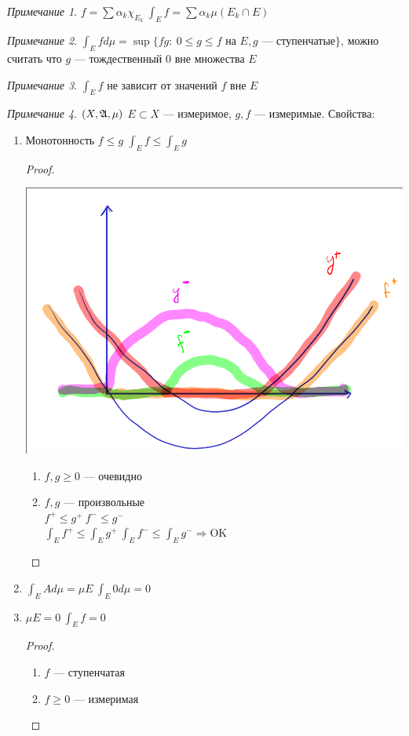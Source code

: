 \documentclass[oneside]{book}
\theoremstyle{plain}
\theoremstyle{remark}
\newtheorem*{remark}{Примечание}
\theoremstyle{definition}
\begin{document}
\begin{remark}
\(f = \sum \alpha_k \chi_{E_k}\ \int_E f = \sum \alpha_k \mu(E_k \cap E)\)
\end{remark}
\begin{remark}
\(\int_E f d\mu = \sup \{fg:\ 0 \le g \le f\text{ на } E, g\text{ --- ступенчатые}\}\), можно считать что \(g\) ---
тождественный 0 вне множества \(E\)
\end{remark}
\begin{remark}
\(\int_E f\) не зависит от значений \(f\) вне \(E\)
\end{remark}
\begin{remark}
\((X, \mathfrak{A}, \mu)\) \(E\subset X\) --- измеримое, \(g, f\) --- измеримые. Свойства:
\begin{enumerate}
\item \label{prop_3_1} Монотонность \(f \le g\) \(\int_E f \le \int_E g\)
\begin{proof}
\-
\begin{center}
\includegraphics[scale=0.3]{3_1.png}
\end{center}
\begin{enumerate}
\item \(f, g \ge 0\) --- очевидно
\item \(f, g\) --- произвольные \\
\(f^+ \le g^+\ f^- \le g^-\) \\
\(\int_E f^+ \le \int_E g^+\ \int_E f^- \le \int_E g^- \Rightarrow \text{OK}\)
\end{enumerate}
\end{proof}
\item \(\int_E Ad\mu = \mu E\ \int_E 0 d\mu = 0\)
\item \label{prop_3_3} \(\mu E = 0\ \int_E f= 0\)
\begin{proof}
\begin{enumerate}
\item \(f\) --- ступенчатая
\item \(f \ge 0\) --- измеримая
\end{enumerate}
\end{proof}


\end{enumerate}
\end{remark}
\end{document}
